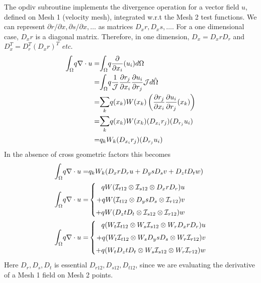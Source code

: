 \documentclass{kthreport}
\begin{document}
The opdiv subroutine implements the divergence operation for a vector field $u$, defined on Mesh 1 (velocity mesh), integrated w.r.t the Mesh 2 test functions. We can represent $\partial r/\partial x, \partial s/\partial x, \ldots$ as matrices $D_{x}r, D_{x}s, \ldots$. For a one dimensional case, $D_{x}r$ is a diagonal matrix. Therefore, in one dimension, $D_{x} = D_{x}rD_{r}$ and $D^{T}_{x} = D^{T}_{r}(D_{x}r)^{T}$ \textit{etc.} 
\begin{eqnarray}
	 \mathlarger\int_{\Omega} q\nabla\cdot u  = & \mathlarger\int_{\Omega} q\dfrac{\partial }{\partial x_{i}}(u_{i}) d\Omega \nonumber \\
	 = & \mathlarger\int_{\Omega} q\dfrac{1}{\mathcal{J}}\dfrac{\partial r_{j}}{\partial x_{i}}\dfrac{\partial u_{i}}{\partial r_{j}} \mathcal{J} d\hat{\Omega} \nonumber \\
	 =& \mathlarger\sum_{k} q(x_{k})W(x_{k})\left(\dfrac{\partial r_{j}}{\partial x_{i}}\dfrac{\partial u_{i}}{\partial r_{j}}(x_{k})\right)  \nonumber \\
	 =& \mathlarger\sum_{k} q(x_{k})W(x_{k})(D_{x_{i}}r_{j})(D_{r_{j}}u_{i})  \nonumber \\
	 =&  q_{k}W_{k}(D_{x_{i}}r_{j})(D_{r_{j}}u_{i})  \nonumber
\end{eqnarray}
In the absence of cross geometric factors this becomes
\begin{eqnarray}
	 \mathlarger\int_{\Omega} q\nabla\cdot u  = &  q_{k}W_{k}(D_{x}rD_{r}u + D_{y}sD_{s}v + D_{z}tD_{t}w)  \nonumber \\
	 \mathlarger\int_{\Omega} q\nabla\cdot u  = & \left\{
	 \begin{split}
	    qW(\mathcal{I}_{t12}\otimes\mathcal{I}_{s12}\otimes D_{x}rD_{r})u \\ 
	    + qW(\mathcal{I}_{t12}\otimes D_{y}sD_{s}\otimes\mathcal{I}_{r12})v \\ 
	    + qW(D_{z}tD_{t}\otimes\mathcal{I}_{s12}\otimes \mathcal{I}_{r12})w
 	 \end{split}\right.  \\
%
	 \mathlarger\int_{\Omega} q\nabla\cdot u  = & \left\{
	 \begin{split}
	q(W_{t}\mathcal{I}_{t12}\otimes W_{s}\mathcal{I}_{s12}\otimes W_{r}D_{x}rD_{r})u \\ 
	+ q(W_{t}\mathcal{I}_{t12}\otimes W_{s}D_{y}sD_{s}\otimes W_{r}\mathcal{I}_{r12})v \\ 
	+ q(W_{t}D_{z}tD_{t}\otimes W_{s}\mathcal{I}_{s12}\otimes W_{r}\mathcal{I}_{r12})w
\end{split}\right.  
\end{eqnarray}
Here $D_{r},D_{s},D_{t}$ is essential $D_{r12},D_{s12},D_{t12}$, since we are evaluating the derivative of a Mesh 1 field on Mesh 2 points.
\end{document}
